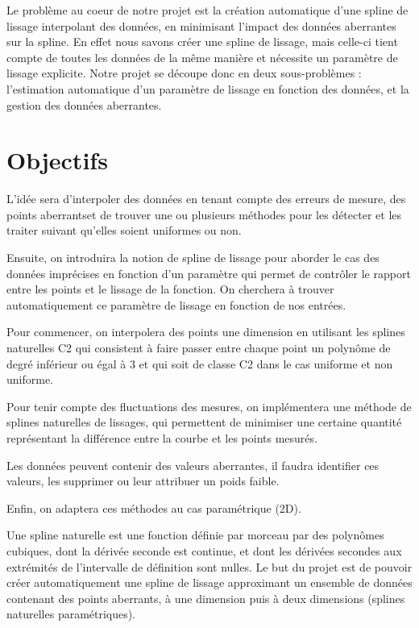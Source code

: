 \documentclass[a4paper,12pt]{article}
\begin{document}
Le problème au coeur de notre projet est la création automatique d'une spline de lissage interpolant des données, en minimisant l'impact des données aberrantes sur la spline. En effet nous savons créer une spline de lissage, mais celle-ci tient compte de toutes les données de la même manière et nécessite un paramètre de lissage explicite.
Notre projet se découpe donc en deux sous-problèmes : l'estimation automatique d'un paramètre de lissage en fonction des données, et la gestion des données aberrantes.

\newpage
\section{Objectifs}


L'idée sera d'interpoler des données en tenant compte des erreurs de mesure, des points aberrantset de trouver une ou plusieurs méthodes pour les détecter et les traiter suivant qu’elles soient uniformes ou non.

Ensuite, on introduira la notion de spline de lissage pour aborder le cas des données imprécises en fonction d’un paramètre qui permet de contrôler le rapport entre les points et le lissage de la fonction. On cherchera à trouver automatiquement ce paramètre de lissage en fonction de nos entrées.

Pour commencer, on interpolera des points une dimension en utilisant les splines naturelles C2 qui consistent à faire passer entre chaque point un polynôme de degré inférieur ou égal à 3 et qui soit de classe C2 dans le cas uniforme et non uniforme.

Pour tenir compte des fluctuations des mesures, on implémentera une méthode de splines naturelles de lissages, qui permettent de minimiser une certaine quantité représentant la différence entre la courbe et les points mesurés.

Les données peuvent contenir des valeurs aberrantes, il faudra identifier ces valeurs, les supprimer ou leur attribuer un poids faible.

Enfin, on adaptera ces méthodes au cas paramétrique (2D).


Une spline naturelle est une fonction définie par morceau par des polynômes cubiques, dont la dérivée seconde est continue, et dont les dérivées secondes aux extrémités de l'intervalle de définition sont nulles.
Le but du projet est de pouvoir créer automatiquement une spline de lissage approximant un ensemble de données contenant des points aberrants, à une dimension puis à deux dimensions (splines naturelles paramétriques).
\end{document}
